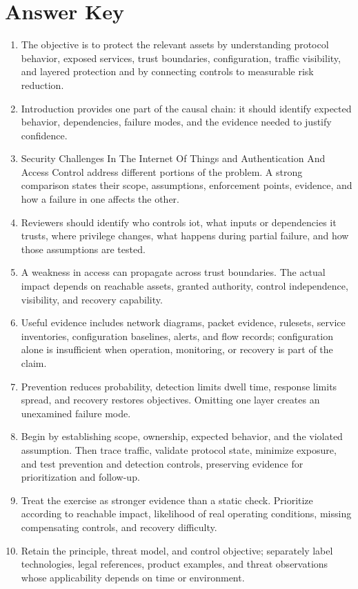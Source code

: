 \documentclass[11pt]{article}
\begin{document}
\section*{Answer Key}
\begin{enumerate}
\item The objective is to protect the relevant assets by understanding protocol behavior, exposed services, trust boundaries, configuration, traffic visibility, and layered protection and by connecting controls to measurable risk reduction.
\item Introduction provides one part of the causal chain: it should identify expected behavior, dependencies, failure modes, and the evidence needed to justify confidence.
\item Security Challenges In The Internet Of Things and Authentication And Access Control address different portions of the problem. A strong comparison states their scope, assumptions, enforcement points, evidence, and how a failure in one affects the other.
\item Reviewers should identify who controls iot, what inputs or dependencies it trusts, where privilege changes, what happens during partial failure, and how those assumptions are tested.
\item A weakness in access can propagate across trust boundaries. The actual impact depends on reachable assets, granted authority, control independence, visibility, and recovery capability.
\item Useful evidence includes network diagrams, packet evidence, rulesets, service inventories, configuration baselines, alerts, and flow records; configuration alone is insufficient when operation, monitoring, or recovery is part of the claim.
\item Prevention reduces probability, detection limits dwell time, response limits spread, and recovery restores objectives. Omitting one layer creates an unexamined failure mode.
\item Begin by establishing scope, ownership, expected behavior, and the violated assumption. Then trace traffic, validate protocol state, minimize exposure, and test prevention and detection controls, preserving evidence for prioritization and follow-up.
\item Treat the exercise as stronger evidence than a static check. Prioritize according to reachable impact, likelihood of real operating conditions, missing compensating controls, and recovery difficulty.
\item Retain the principle, threat model, and control objective; separately label technologies, legal references, product examples, and threat observations whose applicability depends on time or environment.
\end{enumerate}
\end{document}
